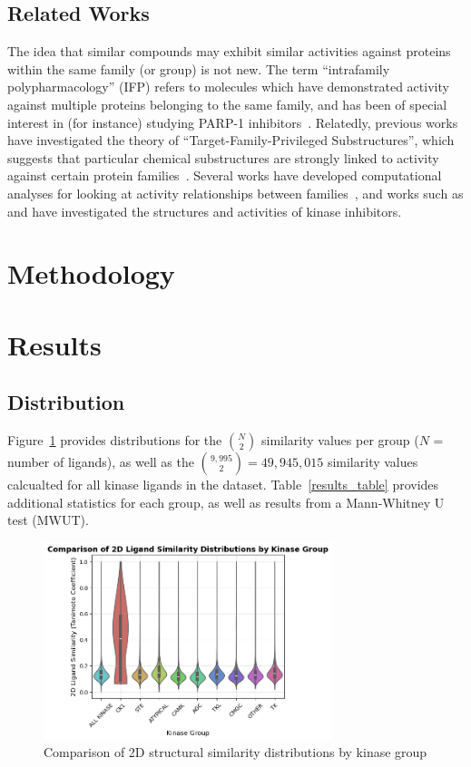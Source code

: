 \documentclass[11pt]{article}
\begin{document}
\subsection*{Related Works}
The idea that similar compounds may exhibit similar activities against proteins within the same family (or group) is not new. 
The term ``intrafamily polypharmacology'' (IFP) refers to molecules which have demonstrated activity against multiple proteins belonging to the same family, and has been of special interest in (for instance) studying PARP-1 inhibitors~\cite{passeri_camaioni_liscio_sabbatini_ferri_carotti_giacchè_pellicciari_gioiello_macchiarulo_2015, antolin_ameratunga_banerji_clarke_workman_al-lazikani_2020}. 
Relatedly, previous works have investigated the theory of ``Target-Family-Privileged Substructures'', which suggests that particular chemical substructures are strongly linked to activity against certain protein families~\cite{schnur_hermsmeier_tebben_2006}. 
Several works have developed computational analyses for looking at activity relationships between families~\cite{bajorath_2008}, and works such as \cite{filip_miljkovic_jurgen_bajorath_2018} and \cite{lo_liu_morrissey_kakiuchi-kiyota_johnson_broccatelli_zhong_joshi_altman_2018} have investigated the structures and activities of kinase inhibitors. 


\section*{Methodology}\label{sec:methodology}

\section*{Results}
\subsection*{Distribution}

Figure~\ref{violin_plot} provides distributions for the ${N\choose 2}$ similarity values per group ($N$ = number of ligands), as well as the ${9,995 \choose 2} = 49,945,015$ similarity values calcualted for all kinase ligands in the dataset. Table~\ref{results_table} provides additional statistics for each group, as well as results from a Mann-Whitney U test (MWUT).
\begin{figure}[H]
    \centering
    \includegraphics[width=0.75\textwidth]{../figures/violin_plot.png}
    \caption{Comparison of 2D structural similarity distributions by kinase group}
    \label{violin_plot}
\end{figure}
\end{document}
